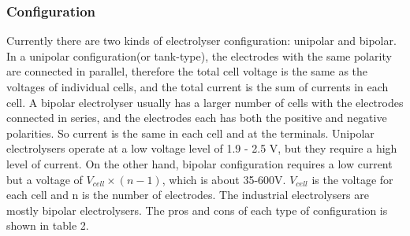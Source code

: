 
\subsubsection{Configuration} 
Currently there are two kinds of electrolyser configuration: unipolar and bipolar. In a unipolar configuration(or tank-type), the electrodes with the same polarity are connected in parallel, therefore the total cell voltage is the same as the voltages of individual cells, and the total current is the sum of currents in each cell. A bipolar electrolyser usually has a larger number of cells with the electrodes connected in series, and the electrodes each has both the positive and negative polarities. So current is the same in each cell and at the terminals. Unipolar electrolysers operate at a low voltage level of 1.9 - 2.5 V, but they require a high level of current. On the other hand, bipolar configuration requires a low current but a voltage of $V_{cell} \times (n-1)$, which is about 35-600V. $V_{cell}$ is the voltage for each cell and n is the number of electrodes. The industrial electrolysers are mostly bipolar electrolysers.
The pros and cons of each type of configuration is shown in table 2.


